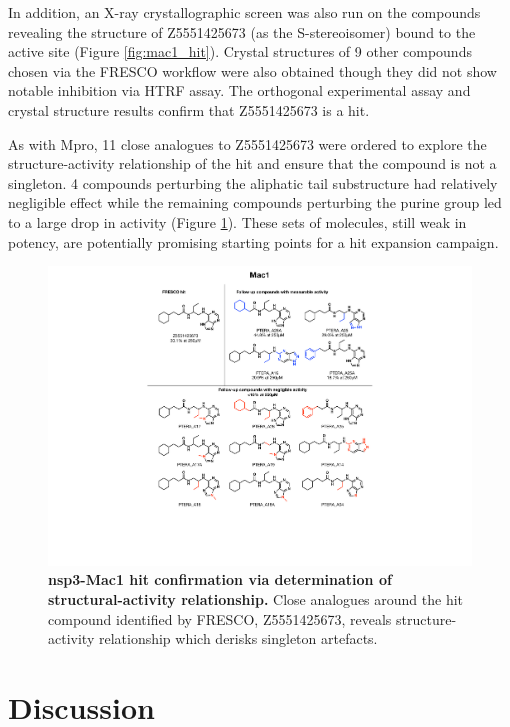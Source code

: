 In addition, an X-ray crystallographic screen was also run on the compounds revealing the structure of Z5551425673 (as the S-stereoisomer) bound to the active site (Figure \ref{fig:mac1_hit}). Crystal structures of 9 other compounds chosen via the FRESCO workflow were also obtained though they did not show notable inhibition via HTRF assay. The orthogonal experimental assay and crystal structure results confirm that Z5551425673 is a hit. 

As with Mpro, 11 close analogues to Z5551425673 were ordered to explore the structure-activity relationship of the hit and ensure that the compound is not a singleton. 4 compounds perturbing the aliphatic tail substructure had relatively negligible effect while the remaining compounds perturbing the purine group led to a large drop in activity (Figure \ref{fig:mac1_rounds}). These sets of molecules, still weak in potency, are potentially promising starting points for a hit expansion campaign. 

\begin{figure}[!t]
 \centering
 \includegraphics[width=0.75\linewidth]{Chapters/Fresco/Figs/mac1_rounds.pdf}
 \caption{\textbf{nsp3-Mac1 hit confirmation via determination of structural-activity relationship.} Close analogues around the hit compound identified by FRESCO, Z5551425673, reveals structure-activity relationship which derisks singleton artefacts.}
 \label{fig:mac1_rounds}
\end{figure}


\section{Discussion} \label{sec:fresco_discussion}

